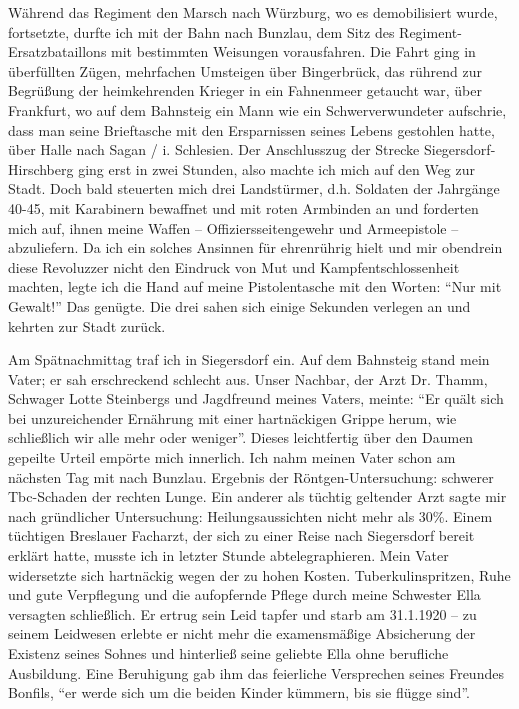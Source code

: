 \documentclass[a5paper,pagesize,10pt,twoside=true]{scrbook}
\begin{document}
Während das Regiment den Marsch nach Würzburg, wo es demobilisiert wurde, fortsetzte, durfte ich mit der Bahn nach Bunzlau, dem Sitz des Regi\-ment-Ersatzbataillons mit bestimmten Weisungen vorausfahren. Die Fahrt ging in überfüllten Zügen, mehrfachen Umsteigen über Bingerbrück, das rührend zur Begrüßung der heimkehrenden Krieger in ein Fahnenmeer getaucht war, über Frankfurt, wo auf dem Bahnsteig ein Mann wie ein Schwerverwundeter aufschrie, dass man seine Brieftasche mit den Ersparnissen seines Lebens gestohlen hatte, über Halle nach Sagan / i. Schlesien. Der Anschlusszug der Strecke Siegersdorf-Hirschberg ging erst in zwei Stunden, also machte ich mich auf den Weg zur Stadt. Doch bald steuerten mich drei Landstürmer, d.h. Soldaten der Jahrgänge 40-45, mit Karabinern bewaffnet und mit roten Armbinden an und forderten mich auf, ihnen meine Waffen -- Offiziersseitengewehr und Armeepistole -- abzuliefern. Da ich ein solches Ansinnen für ehrenrührig hielt und mir obendrein diese Revoluzzer nicht den Eindruck von Mut und Kampfentschlossenheit machten, legte ich die Hand auf meine Pistolentasche mit den Worten: \enquote{Nur mit Gewalt!} Das genügte. Die drei sahen sich einige Sekunden verlegen an und kehrten zur Stadt zurück.

Am Spätnachmittag traf ich in Siegersdorf ein. Auf dem Bahnsteig stand mein Vater; er sah erschreckend schlecht aus. Unser Nachbar, der Arzt Dr. Thamm, Schwager Lotte Steinbergs und Jagdfreund meines Vaters, meinte: \enquote{Er quält sich bei unzureichender Ernährung mit einer hartnäckigen Grippe herum, wie schließlich wir alle mehr oder weniger}. Dieses leichtfertig über den Daumen gepeilte Urteil empörte mich innerlich. Ich nahm meinen Vater schon am nächsten Tag mit nach Bunzlau. Ergebnis der Röntgen-Untersuchung: schwerer Tbc-Schaden der rechten Lunge. Ein anderer als tüchtig geltender Arzt sagte mir nach gründlicher Untersuchung: Heilungsaussichten nicht mehr als 30\%. Einem tüchtigen Breslauer Facharzt, der sich zu einer Reise nach Siegersdorf bereit erklärt hatte, musste ich in letzter Stunde abtelegraphieren. Mein Vater widersetzte sich hartnäckig wegen der zu hohen Kosten. Tuberkulinspritzen, Ruhe und gute Verpflegung und die aufopfernde Pflege durch meine Schwester Ella versagten schließlich. Er ertrug sein Leid tapfer und starb am 31.1.1920 -- zu seinem Leidwesen erlebte er nicht mehr die examensmäßige Absicherung der Existenz seines Sohnes und hinterließ seine geliebte Ella ohne berufliche Ausbildung. Eine Beruhigung gab ihm das feierliche Versprechen seines Freundes Bonfils, \enquote{er werde sich um die beiden Kinder kümmern, bis sie flügge sind}.
\end{document}
